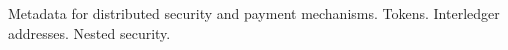 \textsf{Metadata for distributed security and payment mechanisms.  
Tokens.
Interledger addresses.
Nested security.
}

